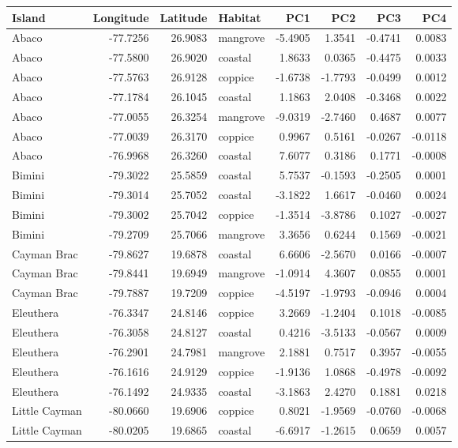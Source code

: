 
\begin{tabular}{lrrlrrrr}
\toprule
Island & Longitude & Latitude & Habitat & PC1 & PC2 & PC3 & PC4\\
\midrule
Abaco & -77.7256 & 26.9083 & mangrove & -5.4905 & 1.3541 & -0.4741 & 0.0083\\
Abaco & -77.5800 & 26.9020 & coastal & 1.8633 & 0.0365 & -0.4475 & 0.0033\\
Abaco & -77.5763 & 26.9128 & coppice & -1.6738 & -1.7793 & -0.0499 & 0.0012\\
Abaco & -77.1784 & 26.1045 & coastal & 1.1863 & 2.0408 & -0.3468 & 0.0022\\
Abaco & -77.0055 & 26.3254 & mangrove & -9.0319 & -2.7460 & 0.4687 & 0.0077\\
Abaco & -77.0039 & 26.3170 & coppice & 0.9967 & 0.5161 & -0.0267 & -0.0118\\
Abaco & -76.9968 & 26.3260 & coastal & 7.6077 & 0.3186 & 0.1771 & -0.0008\\
Bimini & -79.3022 & 25.5859 & coastal & 5.7537 & -0.1593 & -0.2505 & 0.0001\\
Bimini & -79.3014 & 25.7052 & coastal & -3.1822 & 1.6617 & -0.0460 & 0.0024\\
Bimini & -79.3002 & 25.7042 & coppice & -1.3514 & -3.8786 & 0.1027 & -0.0027\\
Bimini & -79.2709 & 25.7066 & mangrove & 3.3656 & 0.6244 & 0.1569 & -0.0021\\
Cayman Brac & -79.8627 & 19.6878 & coastal & 6.6606 & -2.5670 & 0.0166 & -0.0007\\
Cayman Brac & -79.8441 & 19.6949 & mangrove & -1.0914 & 4.3607 & 0.0855 & 0.0001\\
Cayman Brac & -79.7887 & 19.7209 & coppice & -4.5197 & -1.9793 & -0.0946 & 0.0004\\
Eleuthera & -76.3347 & 24.8146 & coppice & 3.2669 & -1.2404 & 0.1018 & -0.0085\\
Eleuthera & -76.3058 & 24.8127 & coastal & 0.4216 & -3.5133 & -0.0567 & 0.0009\\
Eleuthera & -76.2901 & 24.7981 & mangrove & 2.1881 & 0.7517 & 0.3957 & -0.0055\\
Eleuthera & -76.1616 & 24.9129 & coppice & -1.9136 & 1.0868 & -0.4978 & -0.0092\\
Eleuthera & -76.1492 & 24.9335 & coastal & -3.1863 & 2.4270 & 0.1881 & 0.0218\\
Little Cayman & -80.0660 & 19.6906 & coppice & 0.8021 & -1.9569 & -0.0760 & -0.0068\\
Little Cayman & -80.0205 & 19.6865 & coastal & -6.6917 & -1.2615 & 0.0659 & 0.0057\\

\end{tabular}
